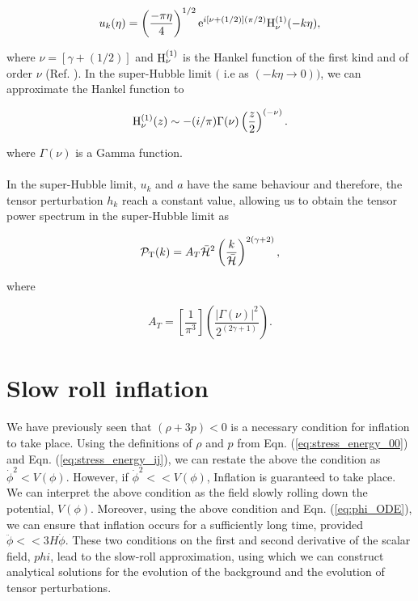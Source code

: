 \documentclass[12pt,a4paper,oneside]{book}
\begin{document}
\begin{equation}\label{eq:u_k_solution}
u_k(\eta) = \left(\frac{-\pi\eta}{4}\right)^{1/2}{\rm e}^{i[\nu+(1/2)]
(\pi/2)}{\rm H}_{\nu}^{(1)}(-k\eta),
\end{equation}

\noindent where $\nu = [\gamma + (1/2)]$ and ${\rm H}_{\nu}^{(1)}$ is the 
Hankel function of the first kind and of order $\nu$ (Ref. \cite{Ab}). In the 
super-Hubble limit $($ i.e as $(-k\eta \rightarrow 0))$, 
we can approximate the Hankel function to

\begin{equation}
{\rm H}_{\nu}^{(1)}(z) \sim -(i/\pi)\Gamma(\nu)\left(\frac{z}{2}\right)^{(-\nu)}.
\end{equation}

\noindent where $\Gamma(\nu)$ is a Gamma function.

\paragraph*{} In the super-Hubble limit, $u_k$ and $a$ have the same 
behaviour and therefore, the tensor perturbation $h_k$ reach a constant value, 
allowing us to obtain the tensor power spectrum in the super-Hubble limit as 

\begin{equation}
\mathcal{P}_{\rm T}(k) = 
A_T\bar{\mathcal{H}}^2\left(\frac{k}{\mathcal{\bar{H}}}\right)^{2(\gamma+2)},
\end{equation}

\noindent where

\begin{equation}
A_T = \left[\frac{1}{\pi^3}\right]
\left(\frac{|\Gamma(\nu)|^2}{2^{(2\gamma+1)}}\right).
\end{equation}

\section{Slow roll inflation}

\paragraph*{} We have previously seen that $(\rho + 3p) < 0$ is a necessary condition 
for inflation to take place. Using the definitions of $\rho$ and $p$ from Eqn. (\ref{eq:stress_energy_00})
 and Eqn. (\ref{eq:stress_energy_ij}), we can restate the above the condition as 
$\dot{\phi}^2<V(\phi)$. However, if $\dot{\phi}^2<<V(\phi)$, Inflation is guaranteed 
to take place. We can interpret the above condition as the field slowly rolling 
down the potential, $V(\phi)$. Moreover, using the above condition and 
Eqn. (\ref{eq:phi_ODE}), we can ensure that inflation occurs for a sufficiently 
long time, provided $\ddot{\phi}<<3H\dot{\phi}$. These two conditions 
on the first and second derivative of the scalar field, $phi$, lead to the slow-roll 
approximation, using which we can construct analytical solutions for the evolution 
of the background and the evolution of tensor perturbations.
\end{document}
